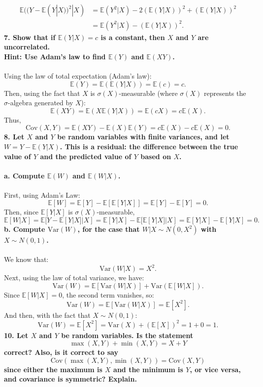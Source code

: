 \documentclass[a4paper,11pt]{article}
\begin{document}
\begin{align*}
    \mathbb{E}((Y - \mathbb{E}(Y|X))^2|X) &= \mathbb{E}(Y^2|X) - 2(\mathbb{E}(Y|X))^2 + (\mathbb{E}(Y|X))^2 \\
    &= \mathbb{E}(Y^2|X) - (\mathbb{E}(Y|X))^2.
\end{align*}
\textbf{7. Show that if \(\mathbb{E}(Y|X) = c\) is a constant, then \(X\) and \(Y\) are uncorrelated.\\
Hint: Use Adam's law to find \(\mathbb{E}(Y)\) and \(\mathbb{E}(XY)\).}
\\ \\
Using the law of total expectation (Adam’s law):
\[
\mathbb{E}(Y) = \mathbb{E}(\mathbb{E}(Y|X)) = \mathbb{E}(c) = c.
\]
Then, using the fact that $X$ is $\sigma(X)$-measurable (where $\sigma(X)$ represents the $\sigma$-algebra generated by $X$):
\[
\mathbb{E}(XY) = \mathbb{E}(X \mathbb{E}(Y|X)) = \mathbb{E}(cX) = c \mathbb{E}(X).
\]
Thus,
\[
\boxed{
\text{Cov}(X, Y) = \mathbb{E}(XY) - \mathbb{E}(X)\mathbb{E}(Y) = c \mathbb{E}(X) - c\mathbb{E}(X) = 0.
}
\]
\textbf{8. Let $X$ and $Y$ be random variables with finite variances, and let $W = Y - \mathbb{E}(Y|X)$. This is a residual: the difference between the true value of $Y$ and the predicted value of $Y$ based on $X$.}
\\ \\
\textbf{a. Compute $\mathbb{E}(W)$ and $\mathbb{E}(W|X)$.}
\\ \\
First, using Adam's Law:
\[
\boxed{
\mathbb{E}[W] = \mathbb{E}[Y] - \mathbb{E}[\mathbb{E}[Y|X]] = \mathbb{E}[Y] - \mathbb{E}[Y] = 0.
}
\]
Then, since $\mathbb{E}[Y|X]$ is $\sigma(X)$-measurable,
\[
\boxed{
\mathbb{E}[W|X] = \mathbb{E}[Y - \mathbb{E}[Y|X] | X] = \mathbb{E}[Y|X] - \mathbb{E}[\mathbb{E}[Y|X]|X] = \mathbb{E}[Y|X] - \mathbb{E}[Y|X] = 0.
}
\]
\textbf{b. Compute $\text{Var}(W)$, for the case that $W|X \sim N(0, X^2)$ with $X \sim N(0, 1)$.}
\\ \\
We know that:
\[
\text{Var}(W|X) = X^2.
\]
Next, using the law of total variance, we have:
\[
\text{Var}(W) = \mathbb{E}[\text{Var}(W|X)] + \text{Var}(\mathbb{E}[W|X]).
\]
Since $\mathbb{E}[W|X] = 0$, the second term vanishes, so:
\[
\text{Var}(W) = \mathbb{E}[\text{Var}(W|X)] = \mathbb{E}[X^2].
\]
And then, with the fact that $X \sim N(0, 1)$:
\[\boxed{
\text{Var}(W) = \mathbb{E}[X^2] = \text{Var}(X) + (\mathbb{E}[X])^2 = 1 + 0 = 1.
}
\]
\textbf{10. Let $X$ and $Y$ be random variables. Is the statement
$$
\max(X, Y) + \min(X, Y) = X + Y
$$
correct? Also, is it correct to say
$$
\text{Cov}(\max(X, Y), \min(X, Y)) = \text{Cov}(X, Y)
$$
since either the maximum is $X$ and the minimum is $Y$, or vice versa, and covariance is symmetric? Explain.
}
\end{document}
